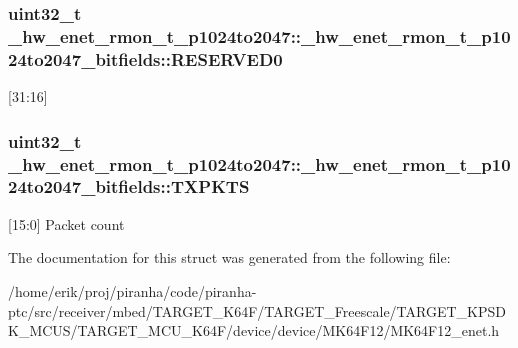 \subsubsection[{\texorpdfstring{R\+E\+S\+E\+R\+V\+E\+D0}{RESERVED0}}]{\setlength{\rightskip}{0pt plus 5cm}uint32\+\_\+t \+\_\+hw\+\_\+enet\+\_\+rmon\+\_\+t\+\_\+p1024to2047\+::\+\_\+hw\+\_\+enet\+\_\+rmon\+\_\+t\+\_\+p1024to2047\+\_\+bitfields\+::\+R\+E\+S\+E\+R\+V\+E\+D0}\hypertarget{struct__hw__enet__rmon__t__p1024to2047_1_1__hw__enet__rmon__t__p1024to2047__bitfields_aeb2a80c7a2f63b81e75942d205accd3d}{}\label{struct__hw__enet__rmon__t__p1024to2047_1_1__hw__enet__rmon__t__p1024to2047__bitfields_aeb2a80c7a2f63b81e75942d205accd3d}
\mbox{[}31\+:16\mbox{]} 
\subsubsection[{\texorpdfstring{T\+X\+P\+K\+TS}{TXPKTS}}]{\setlength{\rightskip}{0pt plus 5cm}uint32\+\_\+t \+\_\+hw\+\_\+enet\+\_\+rmon\+\_\+t\+\_\+p1024to2047\+::\+\_\+hw\+\_\+enet\+\_\+rmon\+\_\+t\+\_\+p1024to2047\+\_\+bitfields\+::\+T\+X\+P\+K\+TS}\hypertarget{struct__hw__enet__rmon__t__p1024to2047_1_1__hw__enet__rmon__t__p1024to2047__bitfields_a45c618b7a98ac0a6445c3e05b8ab9c0b}{}\label{struct__hw__enet__rmon__t__p1024to2047_1_1__hw__enet__rmon__t__p1024to2047__bitfields_a45c618b7a98ac0a6445c3e05b8ab9c0b}
\mbox{[}15\+:0\mbox{]} Packet count 

The documentation for this struct was generated from the following file\+:\begin{DoxyCompactItemize}
\item 
/home/erik/proj/piranha/code/piranha-\/ptc/src/receiver/mbed/\+T\+A\+R\+G\+E\+T\+\_\+\+K64\+F/\+T\+A\+R\+G\+E\+T\+\_\+\+Freescale/\+T\+A\+R\+G\+E\+T\+\_\+\+K\+P\+S\+D\+K\+\_\+\+M\+C\+U\+S/\+T\+A\+R\+G\+E\+T\+\_\+\+M\+C\+U\+\_\+\+K64\+F/device/device/\+M\+K64\+F12/M\+K64\+F12\+\_\+enet.\+h\end{DoxyCompactItemize}
